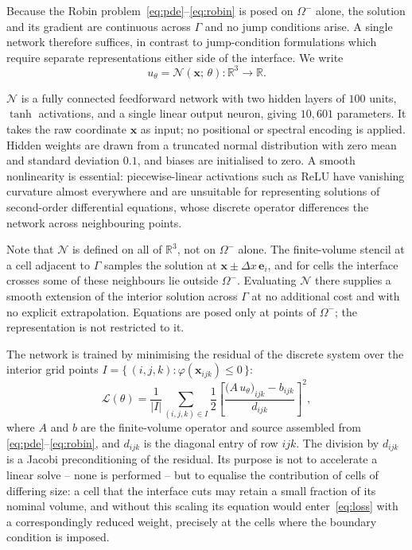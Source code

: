 
Because the Robin problem~\eqref{eq:pde}--\eqref{eq:robin} is posed on $\Omega^{-}$
alone, the solution and its gradient are continuous across $\Gamma$ and no jump
conditions arise. A single network therefore suffices, in contrast to
jump-condition formulations which require separate representations either side of the
interface. We write
\begin{equation}
    u_{\theta} = \mathcal{N}(\mathbf{x};\, \theta) : \mathbb{R}^{3} \to \mathbb{R}.
    \label{eq:network}
\end{equation}

$\mathcal{N}$ is a fully connected feedforward network with two hidden layers of $100$
units, $\tanh$ activations, and a single linear output neuron, giving $10{,}601$
parameters. It takes the raw coordinate $\mathbf{x}$ as input; no positional or
spectral encoding is applied. Hidden weights are drawn from a truncated normal
distribution with zero mean and standard deviation $0.1$, and biases are initialised
to zero. A smooth nonlinearity is essential: piecewise-linear activations such as
ReLU have vanishing curvature almost everywhere and are unsuitable for representing
solutions of second-order differential equations, whose discrete operator differences
the network across neighbouring points.

Note that $\mathcal{N}$ is defined on all of $\mathbb{R}^{3}$, not on $\Omega^{-}$
alone. The finite-volume stencil at a cell adjacent to $\Gamma$ samples the solution
at $\mathbf{x} \pm \Delta x\, \mathbf{e}_{i}$, and for cells the interface crosses
some of these neighbours lie outside $\Omega^{-}$. Evaluating $\mathcal{N}$ there
supplies a smooth extension of the interior solution across $\Gamma$ at no additional
cost and with no explicit extrapolation. Equations are posed only at points of
$\Omega^{-}$; the representation is not restricted to it.

The network is trained by minimising the residual of the discrete system over the
interior grid points $I = \{\, (i,j,k) : \varphi(\mathbf{x}_{ijk}) \leq 0 \,\}$:
\begin{equation}
    \mathcal{L}(\theta)
    = \frac{1}{|I|} \sum_{(i,j,k) \in I}
      \frac{1}{2}
      \left[
        \frac{\bigl(A\, u_{\theta}\bigr)_{ijk} - b_{ijk}}{d_{ijk}}
      \right]^{2},
    \label{eq:loss}
\end{equation}
where $A$ and $b$ are the finite-volume operator and source assembled from
\eqref{eq:pde}--\eqref{eq:robin}, and $d_{ijk}$ is the diagonal entry of row $ijk$.
The division by $d_{ijk}$ is a Jacobi preconditioning of the residual. Its purpose is
not to accelerate a linear solve -- none is performed -- but to equalise the
contribution of cells of differing size: a cell that the interface cuts may retain a
small fraction of its nominal volume, and without this scaling its equation would
enter~\eqref{eq:loss} with a correspondingly reduced weight, precisely at the cells
where the boundary condition is imposed.

